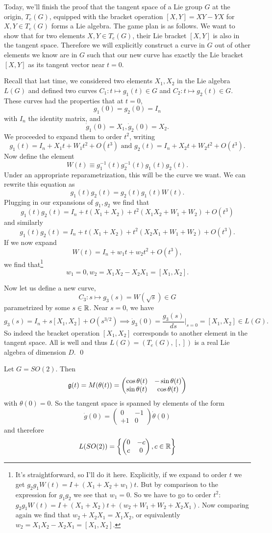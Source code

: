 Today, we'll finish the proof that the tangent space of a Lie group $G$ at the origin, $T_e(G)$, equipped with the bracket operation $[X,Y]=XY-YX$ for $X,Y\in T_e(G)$ forms a Lie algebra. The game plan is as follows. We want to show that for two elements $X,Y\in T_e(G)$, their Lie bracket $[X,Y]$ is also in the tangent space. Therefore we will explicitly construct a curve in $G$ out of other elements we know are in $G$ such that our new curve has exactly the Lie bracket $[X,Y]$ as its tangent vector near $t=0$.

Recall that last time, we considered two elements $X_1,X_2$ in the Lie algebra $L(G)$ and defined two curves $C_1: t\mapsto g_1(t) \in G$ and $C_2: t\mapsto g_2(t)\in G$. These curves had the properties that at $t=0$, $$g_1(0)=g_2(0)=I_n$$ with $I_n$ the identity matrix, and $$\dot g_1(0)=X_1,\dot g_2(0)=X_2.$$ We proceeded to expand them to order $t^2$, writing
$$g_1(t)=I_n+X_1 t+W_1 t^2+O(t^3)\text{ and }g_2(t)=I_n+X_2 t+W_2 t^2+O(t^3).$$
Now define the element
$$W(t)\equiv g_1^{-1}(t) g_2^{-1}(t) g_1(t) g_2(t).$$
Under an appropriate reparametrization, this will be the curve we want. We can rewrite this equation as
$$g_1(t) g_2(t)= g_2(t) g_1(t)W(t).$$
Plugging in our expansions of $g_1,g_2$ we find that
$$g_1(t)g_2(t)= I_n+t(X_1+X_2)+t^2(X_1X_2 +W_1+W_2)+O(t^3)$$
and similarly
$$g_1(t)g_2(t)= I_n+t(X_1+X_2)+t^2(X_2X_1 +W_1+W_2)+O(t^3).$$
If we now expand $$W(t)=I_n+w_1 t+ w_2 t^2+O(t^3),$$
we find that\footnote{It's straightforward, so I'll do it here. Explicitly, if we expand to order $t$ we get $g_2g_1 W(t)=I+(X_1+X_2+w_1)t$. But by comparison to the expression for $g_1g_2$ we see that $w_1=0$. So we have to go to order $t^2$: $g_2g_1 W(t)=I+(X_1+X_2)t+(w_2+W_1+W_2+X_2X_1).$ Now comparing again we find that $w_2+X_2X_1=X_1X_2$, or equivalently $w_2=X_1X_2-X_2X_1=[X_1,X_2]$.}
$$w_1=0, w_2= X_1X_2-X_2X_1=[X_1,X_2].$$

Now let us define a new curve,
$$C_3:s\mapsto g_3(s)=W(\sqrt{s})\in G$$ parametrized by some $s\in \mathbb{R}$. Near $s=0$, we have
$$g_3(s)=I_n+s[X_1,X_2]+O(s^{3/2}) \implies \dot g_3(0)= \frac{g_3(s)}{ds}|_{s=0}=[X_1,X_2]\in L(G).$$
So indeed the bracket operation $[X_1,X_2]$ corresponds to another element in the tangent space. All is well and thus $L(G)=(T_e(G),[,])$ is a real Lie algebra of dimension $D$. \qed

\begin{exm}
Let $G=SO(2)$. Then 
$$\mathfrak{g}(t)=M(\theta(t))=\begin{pmatrix}
\cos\theta(t)&-\sin\theta(t)\\
\sin\theta(t)&\cos\theta(t)
\end{pmatrix}$$
with $\theta(0)=0$. So the tangent space is spanned by elements of the form
$$\dot g(0)=\begin{pmatrix}
0&-1\\
+1&0
\end{pmatrix} \dot\theta(0)$$
and therefore
$$L(SO(2))=\left\{\begin{pmatrix}
0&-c\\
c&0
\end{pmatrix}, c\in \mathbb{R}\right\}$$
\end{exm}